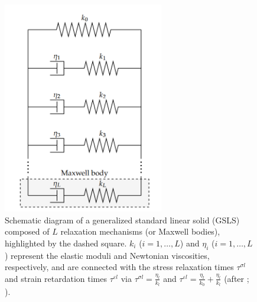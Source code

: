 \begin{figure}[ht!]
    \centering
    \includegraphics[width=7cm]{figures/gsls.png}
    \caption{Schematic diagram of a generalized standard linear solid (GSLS) composed of $L$ relaxation mechanisms (or Maxwell bodies), highlighted by the dashed square. $k_i$ ($i=1,\dots,L$) and $\eta_i$ ($i=1,\dots,L$) represent the elastic moduli and Newtonian viscosities, respectively, and are connected with the stress relaxation times $\tau^{\sigma l}$ and strain retardation times $\tau^{\varepsilon l}$ via $\tau^{\sigma l}=\frac{\eta_l}{k_l}$ and $\tau^{\varepsilon l}=\frac{\eta_l}{k_0}+\frac{\eta_l}{k_l}$ (after \cite{zener:48}; \cite{bohlen:02}).}
    \label{fig:gsls}
\end{figure}

